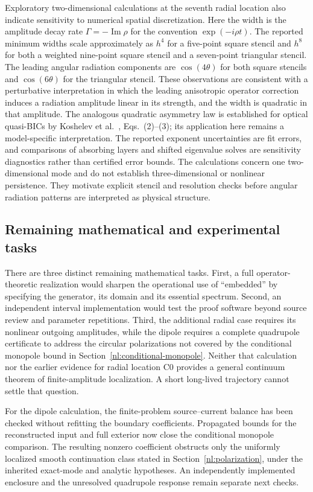 \documentclass[a4paper,11pt]{article}
\begin{document}
Exploratory two-dimensional calculations at the seventh radial location
also indicate sensitivity to numerical spatial discretization. Here the
width is the amplitude decay rate $\Gamma=-\operatorname{Im}\rho$ for
the convention $\exp(-i\rho t)$. The reported minimum widths scale
approximately as $h^4$ for a five-point square stencil and $h^8$ for both
a weighted nine-point square stencil and a seven-point triangular stencil.
The leading angular radiation components are $\cos(4\theta)$ for both
square stencils and $\cos(6\theta)$ for the triangular stencil. These
observations are consistent with a perturbative interpretation in which
the leading anisotropic operator correction induces a radiation amplitude
linear in its strength, and the width is quadratic in that amplitude.
The analogous quadratic asymmetry law is established for optical
quasi-BICs by Koshelev et al.~\cite{Koshelev2018}, Eqs.~(2)--(3);
its application here remains a model-specific interpretation.
The reported exponent uncertainties are fit errors, and comparisons of
absorbing layers and shifted eigenvalue solves are sensitivity diagnostics
rather than certified error bounds. The calculations concern one
two-dimensional mode and do not establish three-dimensional or nonlinear
persistence. They motivate explicit stencil and resolution checks before
angular radiation patterns are interpreted as physical structure.

\subsection{Remaining mathematical and experimental tasks}

There are three distinct remaining mathematical tasks. First, a full
operator-theoretic realization would sharpen the operational use of
``embedded'' by specifying the generator, its domain and its essential
spectrum. Second, an independent interval implementation would test the
proof software beyond source review and parameter repetitions. Third,
the additional radial case requires its nonlinear outgoing amplitudes,
while the dipole requires a complete quadrupole certificate to address
the circular polarizations not covered by the conditional monopole
bound in Section~\ref{nl:conditional-monopole}. Neither that
calculation nor the earlier evidence for radial location C0 provides a general
continuum theorem of finite-amplitude localization. A short long-lived
trajectory cannot settle that question.

For the dipole calculation, the finite-problem source--current balance
has been checked without refitting the boundary coefficients. Propagated
bounds for the reconstructed input and full exterior now close the
conditional monopole comparison. The resulting nonzero coefficient
obstructs only the uniformly localized smooth continuation class stated
in Section~\ref{nl:polarization}, under the inherited exact-mode and
analytic hypotheses. An independently implemented enclosure and the
unresolved quadrupole response remain separate next checks.
\end{document}
